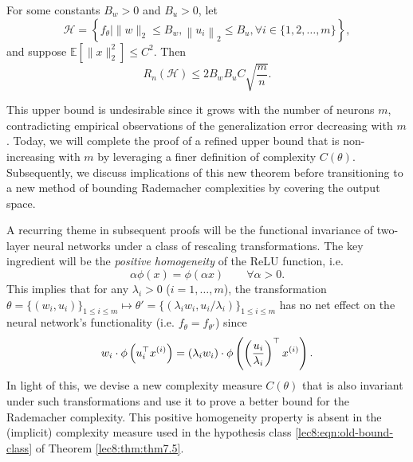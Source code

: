 \begin{theorem}\label{lec8:thm:thm7.5}
For some constants $B_{w}>0$ and $B_{u}>0$, let
\begin{equation}
\mathcal{H}=\left\{f_{\theta} \mid\|w\|_{2} \leq B_{w},\left\|u_{i}\right\|_{2} \leq B_{u}, \forall i \in\{1,2, \ldots, m\}\right\}, \label{lec8:eqn:old-bound-class}
\end{equation}
and suppose $\mathbb{E}\left[\|x\|_{2}^{2}\right] \leq C^{2} .$ Then
\begin{equation}
R_{n}(\mathcal{H}) \leq 2 B_{w} B_{u} C \sqrt{\frac{m}{n}}.
\end{equation}
\end{theorem}

This upper bound is undesirable since it grows with the number of neurons $m$, contradicting empirical observations of the generalization error decreasing with $m$. Today, we will complete the proof of a refined upper bound that is non-increasing with $m$ by leveraging a finer definition of complexity $C(\theta)$. Subsequently, we discuss implications of this new theorem before transitioning to a new method of bounding Rademacher complexities by covering the output space.



A recurring theme in subsequent proofs will be the functional invariance of two-layer neural networks under a class of rescaling transformations. The key ingredient will be the \textit{positive homogeneity} of the ReLU function, i.e.
\begin{equation}
\alpha \phi(x) = \phi(\alpha x) \qquad \forall \alpha > 0.
\end{equation}
This implies that for any $\lambda_i > 0$ ($i = 1, \dots, m$), the transformation $\theta = \{(w_i, u_i)\}_{1 \leq i \leq m} \mapsto \theta' = \{(\lambda_i w_i,  u_i / \lambda_i )\}_{1 \leq i \leq m}$ has no net effect on the neural network's functionality (i.e. $f_{\theta} = f_{\theta'}$) since 
\begin{equation}
w_i\cdot \phi \left(u_i^\top x^{(i)} \right) = (\lambda_i w_i) \cdot \phi\left(\left( \frac{u_i}{\lambda_i}\right)^\top x^{(i)}\right).   
\end{equation}
In light of this, we devise a new complexity measure $C(\theta)$ that is also invariant under such transformations and use it to prove a better bound for the Rademacher complexity. This positive homogeneity property is absent in the (implicit) complexity measure used in the hypothesis class \eqref{lec8:eqn:old-bound-class} of Theorem \ref{lec8:thm:thm7.5}. 

